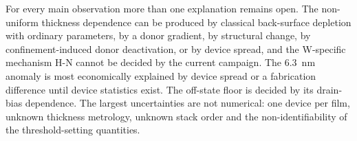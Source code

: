 \begin{keyresult}
For every main observation more than one explanation remains open. The non-uniform thickness dependence can be produced
by classical back-surface depletion with ordinary parameters, by a donor gradient, by structural change, by
confinement-induced donor deactivation, or by device spread, and the W-specific mechanism H-N cannot be decided by the
current campaign. The 6.3~nm anomaly is most economically explained by device spread or a fabrication difference until
device statistics exist. The off-state floor is decided by its drain-bias dependence. The largest uncertainties are not
numerical: one device per film, unknown thickness metrology, unknown stack order and the non-identifiability of the
threshold-setting quantities.
\end{keyresult}
